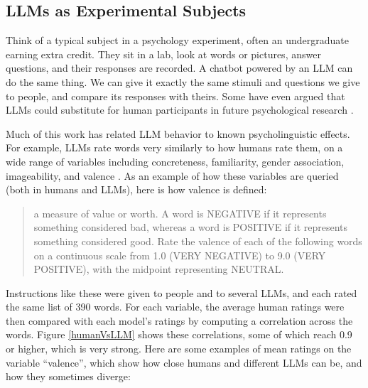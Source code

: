\subsection{LLMs as Experimental Subjects}

Think of a typical subject in a psychology experiment, often an undergraduate
earning extra credit. They sit in a lab, look at words or pictures, answer
questions, and their responses are recorded. A chatbot
powered by an LLM can do the same thing. We can give it exactly the same
stimuli and questions we give to people, and compare its responses with theirs.
Some have even argued that LLMs could substitute for human participants in
future psychological research \cite{aher2023using, dillion2023can}.

Much of this work has related LLM behavior to known psycholinguistic effects.
For example, LLMs rate words very similarly to how humans rate them, on a wide range of variables including concreteness, familiarity, gender association, imageability, and valence \cite{trott2024augment,
kello2024emergent}. As an example of how these variables are queried (both in humans and LLMs), here is how valence is defined:
\begin{quote}
a measure of value or worth. A word is NEGATIVE if it represents something
considered bad, whereas a word is POSITIVE if it represents something
considered good. Rate the valence of each of the following words on a
continuous scale from 1.0 (VERY NEGATIVE) to 9.0 (VERY POSITIVE), with the
midpoint representing NEUTRAL.
\end{quote}
Instructions like these were given to people and to several LLMs, and each
rated the same list of 390 words. For each variable, the average human ratings
were then compared with each model's ratings by computing a correlation across
the words. Figure \ref{humanVsLLM} shows these correlations, some of which
reach 0.9 or higher, which is very strong.  Here are some examples of mean ratings on the variable ``valence'', which show how close humans and different LLMs can be, and how they sometimes diverge:

